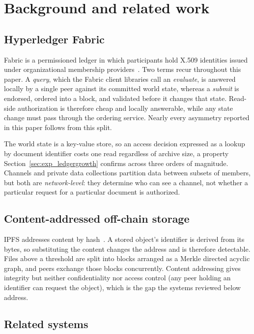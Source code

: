 \documentclass[preprint,12pt]{elsarticle}
\begin{document}
\section{Background and related work}
\label{sec:related}

\subsection{Hyperledger Fabric}
\label{sec:fabric}

Fabric is a permissioned ledger in which participants hold X.509 identities
issued under organizational membership providers~\cite{androulaki2018hyperledger}.
Two terms recur throughout this paper. A \emph{query}, which the
Fabric client libraries call an \emph{evaluate}, is answered
locally by a single peer against its committed world state, whereas a
\emph{submit} is endorsed, ordered into a block, and validated before it
changes that state. Read-side authorization is therefore cheap and locally
answerable, while any state change must pass through the ordering service.
Nearly every asymmetry reported in this paper follows from this split.

The world state is a key-value store, so an access decision expressed as a
lookup by document identifier costs one read regardless of archive size, a property
Section~\ref{sec:exp_ledgergrowth} confirms across three orders of
magnitude. Channels and private data collections partition data between subsets
of members, but both are \emph{network-level}: they determine who can see a
channel, not whether a particular request for a particular document is
authorized.

\subsection{Content-addressed off-chain storage}
\label{sec:ipfs}

IPFS addresses content by hash~\cite{benet2014ipfs}. A stored object's
identifier is derived from its bytes, so substituting the content changes the
address and is therefore detectable. Files above a threshold are split into blocks
arranged as a Merkle directed acyclic graph, and peers exchange those blocks
concurrently. Content addressing gives integrity but neither confidentiality
nor access control (any peer holding an identifier can request the object),
which is the gap the systems reviewed below address.

\subsection{Related systems}
\label{sec:related_systems}
\end{document}
